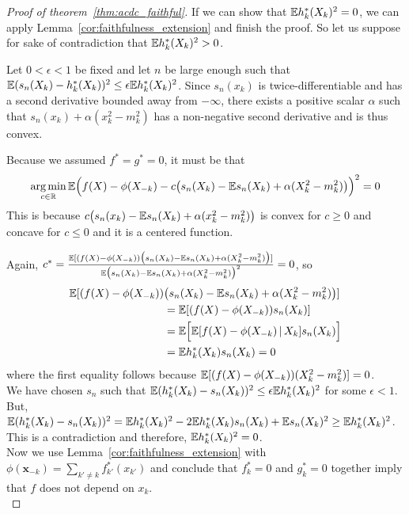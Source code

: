 \begin{proof}[Proof of theorem~\ref{thm:acdc_faithful}]
If we can show that ${\mathbb E} h^*_k(X_k)^2 = 0$, we can apply
Lemma~\ref{cor:faithfulness_extension} and finish the proof. So let us
suppose for sake of contradiction that ${\mathbb E} h^*_k(X_k)^2 > 0$.

Let $0 < \epsilon < 1$ be fixed and let $n$ be large enough such that ${\mathbb E}( s_n(X_k) - h^*_k(X_k))^2 \leq \epsilon {\mathbb E} h^*_k(X_k)^2 $.
Since $s_n(x_k)$ is twice-differentiable and has a second derivative
bounded away from $-\infty$, there exists a positive scalar $\alpha$
such that $s_n(x_k) + \alpha(x_k^2 - m_k^2)$ has a non-negative second
derivative and is thus convex.

Because we assumed $f^* = g^* = 0$, it must be that
\[
\mathop{\text{\rm arg\,min}}_{c \in {\mathbb R}} 
{\mathbb E}\Big( f(X) - \phi(X_{-k}) - c\big( s_n(X_k) - {\mathbb E} s_n(X_k) + \alpha(X_k^2 - m_k^2)\big) \Big)^2 = 0
\]
This is because $c\big( s_n(x_k) - {\mathbb E} s_n(X_k) + \alpha(x_k^2 - m_k^2) \big)$ is
convex for $c \geq 0$ and concave for $c \leq 0$ and it is a centered
function.

Again, $c^* = \frac{\mathbb{E}[(f(X)-\phi(X_{-k}))\big( 
           s_n(X_k) - {\mathbb E} s_n(X_k)  + \alpha (X_k^2 - m_k^2) \big)]}{\mathbb{E}
       \big( s_n(X_k) - {\mathbb E} s_n(X_k) + \alpha (X_k^2 - m_k^2) \big)^2} = 0$, so
\begin{align*}
\mathbb{E}[ (f(X)-\phi(X_{-k}))& \big( s_n(X_k)- {\mathbb E} s_n(X_k) + \alpha
  (X_k^2-m_k^2) \big) ] \\
& = 
\mathbb{E}[ (f(X) - \phi(X_{-k})) s_n(X_k) ] \\
& = \mathbb{E}\Big[ \mathbb{E}[ f(X) - \phi(X_{-k}) {\,|\,} X_k]  s_n(X_k) \Big] \\
& = \mathbb{E} h^*_k(X_k) s_n(X_k)  = 0
\end{align*}
where the first equality follows because ${\mathbb E}[ (f(X) - \phi(X_{-k})) (X_k^2 - m_k^2)] = 0$. \\

We have chosen $s_n$ such that ${\mathbb E}(h^*_k(X_k) - s_n(X_k))^2 \leq \epsilon {\mathbb E} h^*_k(X_k)^2$ for some $\epsilon < 1$. But, ${\mathbb E} (h^*_k(X_k) - s_n(X_k))^2 = {\mathbb E} h^*_k(X_k)^2 - 2 {\mathbb E} h^*_k(X_k)s_n(X_k) + {\mathbb E} s_n(X_k)^2 \geq {\mathbb E} h^*_k(X_k)^2$. This is a contradiction and therefore, ${\mathbb E} h^*_k(X_k)^2 = 0$.\\

Now we use
Lemma~\ref{cor:faithfulness_extension} with $\phi(\mathbf{x}_{-k}) =
\sum_{k' \neq k} f^*_{k'} (x_{k'})$ and conclude that
$f^*_k = 0$ and $g^*_k = 0$ together imply that $f$ does not depend on $x_k$.\\


\end{proof}
